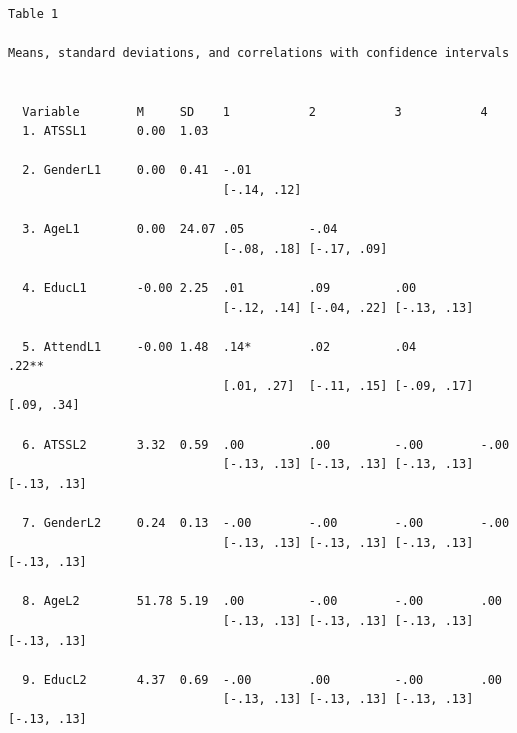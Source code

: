 \documentclass[
  11pt,
]{book}
\begin{document}
\begin{verbatim}

Table 1 

Means, standard deviations, and correlations with confidence intervals
 

  Variable        M     SD    1           2           3           4          
  1. ATSSL1       0.00  1.03                                                 
                                                                             
  2. GenderL1     0.00  0.41  -.01                                           
                              [-.14, .12]                                    
                                                                             
  3. AgeL1        0.00  24.07 .05         -.04                               
                              [-.08, .18] [-.17, .09]                        
                                                                             
  4. EducL1       -0.00 2.25  .01         .09         .00                    
                              [-.12, .14] [-.04, .22] [-.13, .13]            
                                                                             
  5. AttendL1     -0.00 1.48  .14*        .02         .04         .22**      
                              [.01, .27]  [-.11, .15] [-.09, .17] [.09, .34] 
                                                                             
  6. ATSSL2       3.32  0.59  .00         .00         -.00        -.00       
                              [-.13, .13] [-.13, .13] [-.13, .13] [-.13, .13]
                                                                             
  7. GenderL2     0.24  0.13  -.00        -.00        -.00        -.00       
                              [-.13, .13] [-.13, .13] [-.13, .13] [-.13, .13]
                                                                             
  8. AgeL2        51.78 5.19  .00         -.00        -.00        .00        
                              [-.13, .13] [-.13, .13] [-.13, .13] [-.13, .13]
                                                                             
  9. EducL2       4.37  0.69  -.00        .00         -.00        .00        
                              [-.13, .13] [-.13, .13] [-.13, .13] [-.13, .13]
                                                                             

\end{verbatim}
\end{document}
